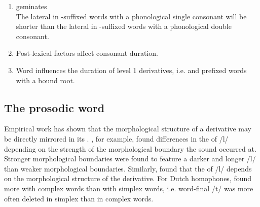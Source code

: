 \begin{enumerate}
		
	\item  {} geminates \\
	The lateral in -suffixed words with a phonological single consonant will be shorter than the lateral in  -suffixed words with a phonological double consonant. 
	
	\item Post-lexical factors affect consonant duration.
	


	\item Word  influences the duration of {level 1} derivatives, i.e.  and prefixed words with a bound root.
	
\end{enumerate}



\subsection{The prosodic word} {\label{prosodic word}}


Empirical work has shown that the morphological structure of a derivative may be directly mirrored in its . %
\cite{Sproat.1993b}, for example, found differences in the  of /l/ depending on the strength of the morphological boundary the sound occurred at. Stronger morphological boundaries were found to feature a darker and longer /l/ than weaker morphological boundaries. Similarly, \cite{LeeKim.2013} found that the  of /l/ depends on the morphological structure of the derivative. 
For Dutch homophones, \cite{Schuppler.2012} found more  with complex words than with simplex words, i.e. word-final /t/ was more often deleted in simplex than in complex words.

